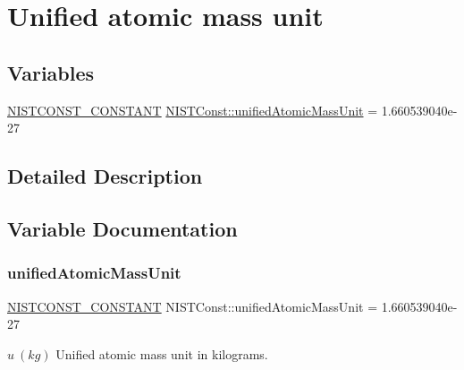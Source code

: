 \hypertarget{group___n_i_s_t_const-_unified_atomic_mass_unit}{}\section{Unified atomic mass unit}
\label{group___n_i_s_t_const-_unified_atomic_mass_unit}
\subsection*{Variables}
\begin{DoxyCompactItemize}
\item 
\mbox{\hyperlink{_n_i_s_t_const_8hpp_a2b0fc1d7452373f816175dd86ce26729}{N\+I\+S\+T\+C\+O\+N\+S\+T\+\_\+\+C\+O\+N\+S\+T\+A\+NT}} \mbox{\hyperlink{group___n_i_s_t_const-_unified_atomic_mass_unit_ga71274ecfb5b197a764bab758ed6840c9}{N\+I\+S\+T\+Const\+::unified\+Atomic\+Mass\+Unit}} = 1.\+660539040e-\/27
\end{DoxyCompactItemize}


\subsection{Detailed Description}


\subsection{Variable Documentation}
\mbox{\label{group___n_i_s_t_const-_unified_atomic_mass_unit_ga71274ecfb5b197a764bab758ed6840c9}} 
\subsubsection{\texorpdfstring{unified\+Atomic\+Mass\+Unit}{unifiedAtomicMassUnit}}
{\footnotesize\ttfamily \mbox{\hyperlink{_n_i_s_t_const_8hpp_a2b0fc1d7452373f816175dd86ce26729}{N\+I\+S\+T\+C\+O\+N\+S\+T\+\_\+\+C\+O\+N\+S\+T\+A\+NT}} N\+I\+S\+T\+Const\+::unified\+Atomic\+Mass\+Unit = 1.\+660539040e-\/27}

$u \ (kg)$ Unified atomic mass unit in kilograms. 